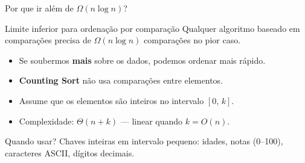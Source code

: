 \documentclass[aspectratio=169]{beamer}
\begin{document}
\begin{frame}{Por que ir além de $\Omega(n \log n)$?}
  \begin{block}{Limite inferior para ordenação por comparação}
    Qualquer algoritmo baseado em comparações precisa de $\Omega(n \log n)$
    comparações no pior caso.
  \end{block}
  \vspace{0.3cm}
  \begin{itemize}
    \item Se soubermos \textbf{mais} sobre os dados, podemos ordenar mais rápido.
    \item \textbf{Counting Sort} não usa comparações entre elementos.
    \item Assume que os elementos são inteiros no intervalo $[0,\, k]$.
    \item Complexidade: $\Theta(n + k)$ — linear quando $k = O(n)$.
  \end{itemize}
  \vspace{0.3cm}
  \begin{exampleblock}{Quando usar?}
    Chaves inteiras em intervalo pequeno: idades, notas (0–100),
    caracteres ASCII, dígitos decimais.
  \end{exampleblock}
\end{frame}
\end{document}
